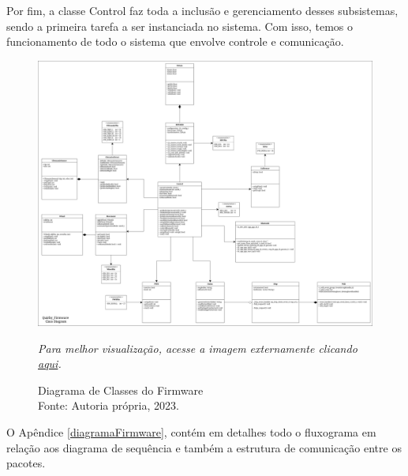 Por fim, a classe Control faz toda a inclusão e gerenciamento desses subsistemas, sendo a primeira tarefa a ser instanciada no sistema. Com isso, temos o funcionamento de todo o sistema que envolve controle e comunicação.

\begin{figure}[h!]
\centering
\includegraphics[scale=0.2]{figuras/Quirby_Firmware_Diagrama_de_Classes.jpg}
\caption{Diagrama de Classes do Firmware \\ Fonte: Autoria própria, 2023. }
\textit{Para melhor visualização, acesse a imagem externamente clicando \href{https://drive.google.com/file/d/1FaDMcYj23tRlHez7_HY8dnomueZytGaC/view?usp=sharing}{aqui}.}
\label{diagramaClasseFirm}
\end{figure}

O Apêndice \ref{diagramaFirmware}, contém em detalhes todo o fluxograma em relação aos diagrama de sequência e também a estrutura de comunicação entre os pacotes. 